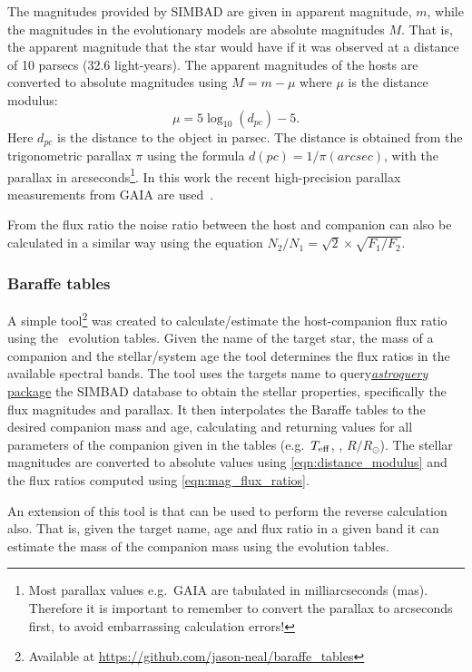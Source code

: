 
The magnitudes provided by {SIMBAD} are given in apparent magnitude, $m$, while the magnitudes in the evolutionary models are absolute magnitudes $M$. That is, the apparent magnitude that the star would have if it was observed at a distance of 10 parsecs (32.6 light-years). The apparent magnitudes of the hosts are converted to absolute magnitudes using \(M = m - \mu\) where \(\mu\) is the distance modulus:
\begin{equation}
\mu = 5 \log_{10}(d_{pc}) -5. \label{eqn:distance_modulus}
\end{equation}
Here $d_{pc}$ is the distance to the object in parsec. The distance is obtained from the trigonometric parallax  $\pi$ using the formula $d(pc) = 1 /\pi(arcsec)$, with the parallax in arcseconds\footnote{Most parallax values e.g.\ GAIA are tabulated in milliarcseconds (mas). Therefore it is important to remember to convert the parallax to arcseconds first, to avoid embarrassing calculation errors!}. In this work the recent high-precision parallax measurements from GAIA are used~\citet{collaboration_gaia_2018}.

From the flux ratio the noise ratio between the host and companion can also be calculated in a similar way using the equation \(N_{2}/N_{1} = \sqrt{2} \times\sqrt{F_{1}/F_{2}}\).


\subsubsection{Baraffe tables}
\label{subsubsec:baraffe_tables_code}
A simple tool\footnote{Available at \href{https://github.com/jason-neal/baraffe_tables}{https://github.com/jason-neal/baraffe\_tables}} was created to calculate/estimate the host-companion flux ratio using the~\citet{baraffe_evolutionary_2003, baraffe_new_2015} evolution tables.
Given the name of the target star, the mass of a companion and the stellar/system age the tool determines the flux ratios in the available spectral bands.
The tool uses the targets name to query\href{https://zenodo.org/record/1160627}{\emph{astroquery} package} the {SIMBAD} database to obtain the stellar properties, specifically the flux magnitudes and parallax. It then interpolates the Baraffe tables to the desired companion mass and age, calculating and returning values for all parameters of the companion given in the tables (e.g.\ \(T_{\mathrm{eff}}\), \logg, \(R/R_{\odot}\)).
The stellar magnitudes are converted to absolute values using \cref{eqn:distance_modulus} and the flux ratios computed using \cref{eqn:mag_flux_ratios}.

An extension of this tool is that can be used to perform the reverse calculation also. That is, given the target name, age and flux ratio in a given band it can estimate the mass of the companion mass using the evolution tables.

